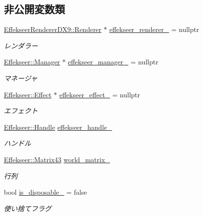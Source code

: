 \subsection*{非公開変数類}
\begin{DoxyCompactItemize}
\item 
\mbox{\hyperlink{class_effekseer_renderer_d_x9_1_1_renderer}{Effekseer\+Renderer\+D\+X9\+::\+Renderer}} $\ast$ \mbox{\hyperlink{class_effekseer_object_a39d29eb6a967f325b3d8659c231e0525}{effekseer\+\_\+renderer\+\_\+}} = nullptr
\begin{DoxyCompactList}\small\item\em レンダラー \end{DoxyCompactList}\item 
\mbox{\hyperlink{class_effekseer_1_1_manager}{Effekseer\+::\+Manager}} $\ast$ \mbox{\hyperlink{class_effekseer_object_a9f66433b8cecd6753b478a73f93f8179}{effekseer\+\_\+manager\+\_\+}} = nullptr
\begin{DoxyCompactList}\small\item\em マネージャ \end{DoxyCompactList}\item 
\mbox{\hyperlink{class_effekseer_1_1_effect}{Effekseer\+::\+Effect}} $\ast$ \mbox{\hyperlink{class_effekseer_object_a66c732f526b92301c72070648ca7e70f}{effekseer\+\_\+effect\+\_\+}} = nullptr
\begin{DoxyCompactList}\small\item\em エフェクト \end{DoxyCompactList}\item 
\mbox{\hyperlink{namespace_effekseer_afba58b8d812da862190e9bbfc040824a}{Effekseer\+::\+Handle}} \mbox{\hyperlink{class_effekseer_object_ac3e771c9f05d91dfe392959591595b7e}{effekseer\+\_\+handle\+\_\+}}
\begin{DoxyCompactList}\small\item\em ハンドル \end{DoxyCompactList}\item 
\mbox{\hyperlink{struct_effekseer_1_1_matrix43}{Effekseer\+::\+Matrix43}} \mbox{\hyperlink{class_effekseer_object_a16171d7157607b9d6a5fc0aa4ad9d454}{world\+\_\+matrix\+\_\+}}
\begin{DoxyCompactList}\small\item\em 行列 \end{DoxyCompactList}\item 
bool \mbox{\hyperlink{class_effekseer_object_ae48424a2f453590f97ce1b412882943f}{is\+\_\+disposable\+\_\+}} = false
\begin{DoxyCompactList}\small\item\em 使い捨てフラグ \end{DoxyCompactList}\item 

\end{DoxyCompactItemize}
